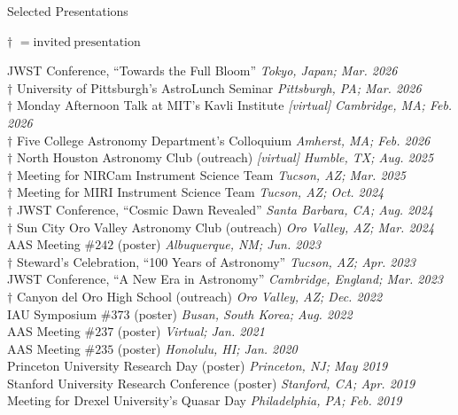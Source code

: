 \documentclass{JMH_CV}
\begin{document}

\begin{rSection}{Selected Presentations}

{\boldmath$\dagger$} $= \mathrm{invited\ presentation}$

JWST Conference, ``Towards the Full Bloom'' \hfill \textit{Tokyo, Japan; Mar. 2026} \\
{\boldmath$\dagger$} University of Pittsburgh's AstroLunch Seminar \hfill \textit{Pittsburgh, PA; Mar. 2026} \\
{\boldmath$\dagger$} Monday Afternoon Talk at MIT’s Kavli Institute \textit{[virtual]} \hfill \textit{Cambridge, MA; Feb. 2026} \\
{\boldmath$\dagger$} Five College Astronomy Department's Colloquium \hfill \textit{Amherst, MA; Feb. 2026} \\
{\boldmath$\dagger$} North Houston Astronomy Club (outreach) \textit{[virtual]} \hfill \textit{Humble, TX; Aug. 2025} \\
{\boldmath$\dagger$} Meeting for NIRCam Instrument Science Team \hfill \textit{Tucson, AZ; Mar. 2025} \\
{\boldmath$\dagger$} Meeting for MIRI Instrument Science Team \hfill \textit{Tucson, AZ; Oct. 2024} \\
{\boldmath$\dagger$} JWST Conference, ``Cosmic Dawn Revealed'' \hfill \textit{Santa Barbara, CA; Aug. 2024} \\
{\boldmath$\dagger$} Sun City Oro Valley Astronomy Club (outreach) \hfill \textit{Oro Valley, AZ; Mar. 2024} \\
AAS Meeting $\#242$ (poster) \hfill \textit{Albuquerque, NM; Jun. 2023} \\
{\boldmath$\dagger$} Steward's Celebration, ``100 Years of Astronomy'' \hfill \textit{Tucson, AZ; Apr. 2023} \\
JWST Conference, ``A New Era in Astronomy'' \hfill \textit{Cambridge, England; Mar. 2023} \\
{\boldmath$\dagger$} Canyon del Oro High School (outreach) \hfill \textit{Oro Valley, AZ; Dec. 2022} \\
IAU Symposium $\#373$ (poster) \hfill \textit{Busan, South Korea; Aug. 2022} \\
AAS Meeting $\#237$ (poster) \hfill \textit{Virtual; Jan. 2021} \\
AAS Meeting $\#235$ (poster) \hfill \textit{Honolulu, HI; Jan. 2020} \\
Princeton University Research Day (poster) \hfill \textit{Princeton, NJ; May 2019} \\
Stanford University Research Conference (poster) \hfill \textit{Stanford, CA; Apr. 2019} \\
Meeting for Drexel University's Quasar Day \hfill \textit{Philadelphia, PA; Feb. 2019}
    

\end{rSection}
\end{document}
